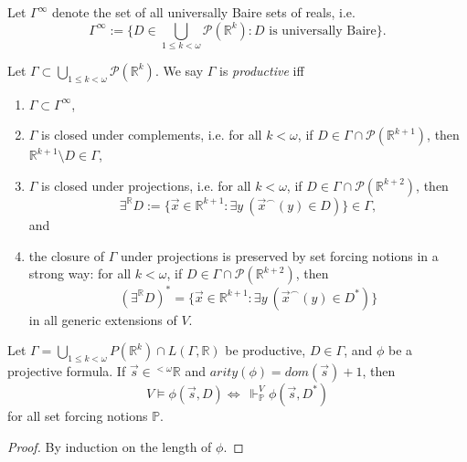 \documentclass[12pt]{article}
\numberwithin{equation}{section}
\begin{document}
\begin{defi}
Let $\Gamma^{\infty}$ denote the set of all universally Baire sets of reals, i.e. 
\begin{equation*}
    \Gamma^{\infty} := \{D \in \bigcup_{1 \leq k < \omega} \mathcal{P}(\mathbb{R}^k) : D \text{ is universally Baire}\}.
\end{equation*}
\end{defi}

\begin{defi}
Let $\Gamma \subset \bigcup_{1 \leq k < \omega} \mathcal{P}(\mathbb{R}^k)$. We say $\Gamma$ is \emph{productive} iff
\begin{enumerate}[label=(\alph*)]
    \item $\Gamma \subset \Gamma^{\infty}$,
    \item $\Gamma$ is closed under complements, i.e. for all $k < \omega$, if $D \in \Gamma \cap \mathcal{P}(\mathbb{R}^{k+1})$, then $\mathbb{R}^{k+1} \setminus D \in \Gamma$,
    \item $\Gamma$ is closed under projections, i.e. for all $k < \omega$, if $D \in \Gamma \cap \mathcal{P}(\mathbb{R}^{k+2})$, then
    \begin{equation*}
        \exists^{\mathbb{R}} D := \{\Vec{x} \in \mathbb{R}^{k+1} : \exists y \ (\Vec{x}^{\frown}(y) \in D)\} \in \Gamma,
    \end{equation*}
    and
    \item the closure of $\Gamma$ under projections is preserved by set forcing notions in a strong way: for all $k < \omega$, if $D \in \Gamma \cap \mathcal{P}(\mathbb{R}^{k+2})$, then
    \begin{equation*}
        (\exists^{\mathbb{R}} D)^* = \{\Vec{x} \in \mathbb{R}^{k+1} : \exists y \ (\Vec{x}^{\frown}(y) \in D^*)\}
    \end{equation*}
    in all generic extensions of $V$.
\end{enumerate}
\end{defi}

\begin{lem}\label{prod}
Let $\Gamma  = \bigcup_{1 \leq k < \omega} P(\mathbb{R}^{k}) \cap L(\Gamma, \mathbb{R})$ be productive, $D \in \Gamma$, and $\phi$ be a projective formula. If $\Vec{s} \in {^{< \omega}{\mathbb{R}}}$ and $arity(\phi) = dom(\Vec{s}) + 1$, then 
\begin{equation*}
    V \models \phi(\Vec{s}, D) \iff \ \Vdash^V_{\mathbb{P}} \phi(\Vec{s}, D^*)
\end{equation*}
for all set forcing notions $\mathbb{P}$.
\end{lem}
\begin{proof}
By induction on the length of $\phi$.
\end{proof}
\end{document}

